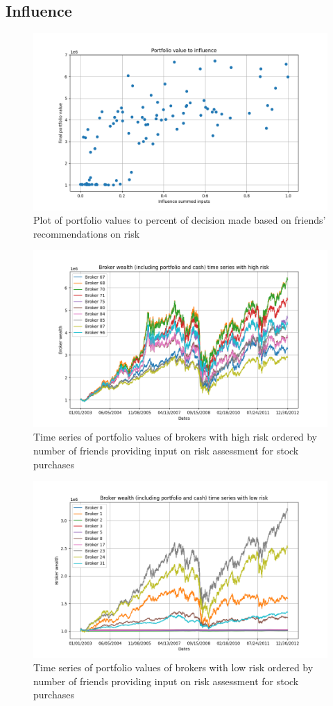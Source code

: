 \documentclass[letterpaper, 11 pt, proceedings]{IEEEtran}
\begin{document}
	
	\subsection{Influence}
	
	\begin{figure}[h]
		\centering
		\includegraphics[width=.4\textwidth]{valueToInfluence_influence04.png}
		\caption{Plot of portfolio values to percent of decision made based on friends' recommendations on risk}
		\label{fig:value_to_influence_influencerun}
	\end{figure}	
	\FloatBarrier
	
	\begin{figure}[h]
		\centering
		\includegraphics[width=.4\textwidth]{timeSeriesJoint_influenceRun04_HighRisk.png}
		\caption{Time series of portfolio values of brokers with high risk ordered by number of friends providing input on risk assessment for stock purchases}
		\label{fig:high_risk_influence_time_series}
	\end{figure}	
	\FloatBarrier

	\begin{figure}[h]
		\centering
		\includegraphics[width=.4\textwidth]{timeSeriesJoint_influenceRun04_LowRisk.png}
		\caption{Time series of portfolio values of brokers with low risk ordered by number of friends providing input on risk assessment for stock purchases}
		\label{fig:low_risk_influence_time_series}
	\end{figure}	
	\FloatBarrier
\end{document}
